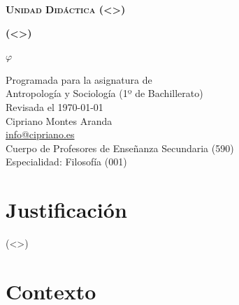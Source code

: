 \documentclass[12pt]{article}
\newcommand{\numeroUD}{(<>)}
\newcommand{\tituloUD}{(<>)}
\begin{document}
\begin{titlepage}
        \begin{center}
                \vspace*{0.5cm}

                \Huge
		\textbf{\scshape Unidad Didáctica \numeroUD}

                \vspace{0.5cm}
                \LARGE
		\textbf{\tituloUD}\\
                \vfill

                \Huge
		{\fontsize{225pt}{45pt}\selectfont $\varphi$} %

                \vfill
                \large
		Programada para la asignatura de\\
		Antropología y Sociología (1º de Bachillerato)\\

                \vspace{0.25cm}
		\normalsize
		Revisada el \today\\ %

                \vspace{0.75cm}
		\Large
                Cipriano Montes Aranda\\
                \large
                \href{mailto:info@cipriano.es}{info@cipriano.es}\\ %
		\normalsize
                \vspace{0.2cm}
		Cuerpo de Profesores de Enseñanza Secundaria (590)\\
		Especialidad: Filosofía (001)
 \end{center}
\end{titlepage}

\pagestyle{empty}

\onehalfspace
\tableofcontents %

\newpage

\normalsize

\pagestyle{fancy}

\section{Justificación}

(<>)

\section{Contexto}
\end{document}

